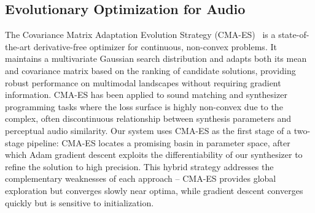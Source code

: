 \subsection{Evolutionary Optimization for Audio}

The Covariance Matrix Adaptation Evolution Strategy (CMA-ES)~\cite{hansen2016cmaes} is a state-of-the-art derivative-free optimizer for continuous, non-convex problems.
It maintains a multivariate Gaussian search distribution and adapts both its mean and covariance matrix based on the ranking of candidate solutions, providing robust performance on multimodal landscapes without requiring gradient information.
CMA-ES has been applied to sound matching and synthesizer programming tasks where the loss surface is highly non-convex due to the complex, often discontinuous relationship between synthesis parameters and perceptual audio similarity.
Our system uses CMA-ES as the first stage of a two-stage pipeline: CMA-ES locates a promising basin in parameter space, after which Adam gradient descent exploits the differentiability of our synthesizer to refine the solution to high precision.
This hybrid strategy addresses the complementary weaknesses of each approach -- CMA-ES provides global exploration but converges slowly near optima, while gradient descent converges quickly but is sensitive to initialization.

